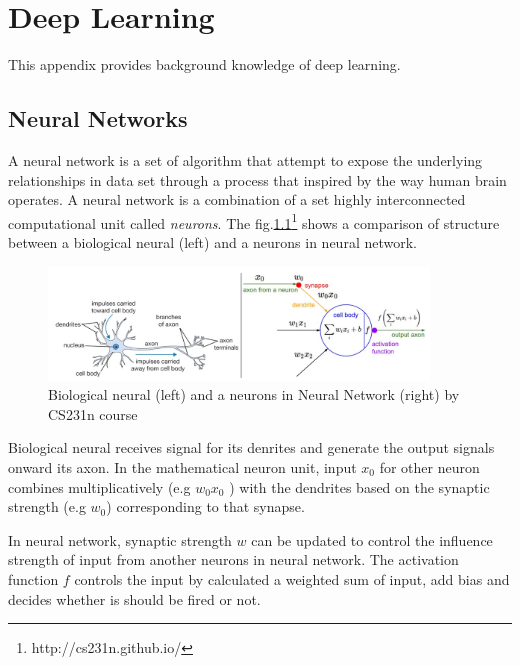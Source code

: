 \chapter{Deep Learning}
\hspace{0.45cm}This appendix provides background knowledge of deep learning.
\section{Neural Networks}

\hspace{0.45cm}A neural network is a set of algorithm that attempt to expose the underlying relationships in data set through a 
process that inspired by the way human brain operates\cite{cs231n}. A neural network is a combination of a set highly interconnected computational unit called \textit{neurons}.
 The fig.\ref{fig:nn_arc}\footnote{http://cs231n.github.io/} shows a comparison of structure between a biological neural (left) and a neurons in neural network.\par
\begin{figure}[h!]
    \centering
    \includegraphics[width=0.9\textwidth]{Chapters/Fig/neural_arc.PNG}
    \caption{Biological neural (left) and a neurons in Neural Network (right) by CS231n course}
    \label{fig:nn_arc}
\end{figure}
Biological neural receives signal for its denrites and generate the output signals onward its axon. 
In the mathematical neuron unit, input $x_0$ for other neuron combines multiplicatively (e.g $w_0x_0$ )
with the dendrites based on the synaptic strength (e.g $w_0$) corresponding to that synapse\cite{Goodfellow-et-al-2016}.\par
In neural network, synaptic strength $w$ can be updated to control the influence strength of input from another neurons in neural network. 
The activation function $f$ controls the input by calculated a weighted sum of input, add bias and decides whether is should be fired or not.\cite{cs231n}
